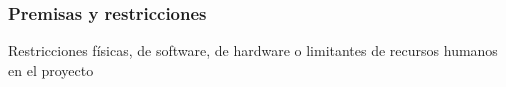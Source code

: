 \subsubsection{Premisas y restricciones}
Restricciones físicas, de software, de hardware o limitantes de recursos humanos en el proyecto